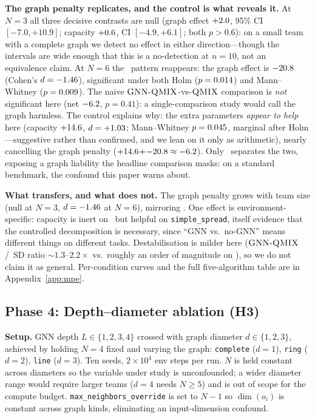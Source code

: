 \textbf{The graph penalty replicates, and the control is what reveals
it.} At $N{=}3$ all three decisive contrasts are null (graph effect
$+2.0$, 95\% CI $[-7.0, +10.9]$; capacity $+0.6$,
CI $[-4.9, +6.1]$; both $p>0.6$): on a small
team with a complete graph we detect no effect in either
direction---though the intervals are wide enough that this is a
no-detection at $n{=}10$, not an equivalence claim. At
$N{=}6$ the \coordgrid\ pattern reappears: the graph effect is
$-20.8$ (Cohen's $d=-1.46$), significant under both Holm
($p=0.014$) and Mann--Whitney ($p=0.009$). The naive $\textsc{GNN-QMIX}$-vs-$\textsc{QMIX}$ comparison is \emph{not} significant here
(net $-6.2$, $p=0.41$): a single-comparison study would call the
graph harmless. The control explains why: the extra parameters \emph{appear
to help}
here (capacity $+14.6$, $d=+1.03$; Mann--Whitney
$p=0.045$, marginal after Holm---suggestive rather than confirmed,
and we lean on it only as arithmetic), nearly cancelling the graph
penalty ($+14.6\!+\!-20.8\approx-6.2$). Only
\mlpqmix\ separates the two, exposing a graph liability the headline
comparison masks: on a standard benchmark, the confound this paper
warns about.

\textbf{What transfers, and what does not.} The graph penalty grows with
team size (null at $N{=}3$, $d=-1.46$ at $N{=}6$), mirroring
\coordgrid. One effect is environment-specific: capacity is inert on
\coordgrid\ but helpful on \texttt{simple\_spread}, itself evidence that
the controlled decomposition is necessary, since ``GNN vs.\ no-GNN'' means
different things on different tasks. Destabilisation is milder here
($\textsc{GNN-QMIX}$/\mlpqmix\ SD ratio ${\sim}1.3$--$2.2\times$ vs.\
roughly an order of magnitude on \coordgrid), so we do not claim it as general.
Per-condition curves and the full five-algorithm table are in
Appendix~\ref{app:mpe}.

\subsection{Phase 4: Depth--diameter ablation (H3)}
\label{sec:results:ablation}

\textbf{Setup.} GNN depth $L \in \{1, 2, 3, 4\}$ crossed with graph
diameter $d \in \{1, 2, 3\}$, achieved by holding $N=4$ fixed and
varying the graph: \texttt{complete} ($d=1$), \texttt{ring} ($d=2$),
\texttt{line} ($d=3$). Ten seeds, $2 \times 10^4$ env steps per run.
$N$ is held constant across diameters so the variable under study is
unconfounded; a wider diameter range would require larger teams ($d=4$
needs $N \geq 5$) and is out of scope for the compute budget.
\texttt{max\_neighbors\_override} is set to $N-1$ so $\dim(o_i)$ is
constant across graph kinds, eliminating an input-dimension confound.

